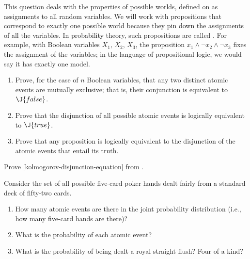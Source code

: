 \begin{exercise}%
This question deals with the properties of possible worlds, defined on  as assignments to all random variables.
We will work with propositions that correspond to exactly one possible world because they pin down the assignments of all the variables.
In probability theory, such propositions are called .
For example, with Boolean variables \(X_1\), \(X_2\), \(X_3\), the proposition \(x_1\land \lnot x_2 \land \lnot x_3\) fixes the assignment of the variables; in the language of propositional logic, we would say it has exactly one model.
\begin{enumerate}
\item Prove, for the case of \(n\) Boolean variables, that any two distinct atomic events are mutually exclusive; that is, their conjunction is equivalent to \(\J{false}\).
\item Prove that the disjunction of all possible atomic events is
logically equivalent to \(\J{true}\). 
\item Prove that any proposition is logically equivalent to the
disjunction of the atomic events that entail its truth.
\end{enumerate}
\end{exercise} 

\begin{exercise}%
Prove \eqref{kolmogorov-disjunction-equation} from .
\end{exercise} 

\begin{exercise}
Consider the set of all possible five-card poker hands dealt fairly
from a standard deck of fifty-two cards.
\begin{enumerate}
\item How many atomic events are there in the joint probability distribution
(i.e., how many five-card hands are there)?
\item What is the probability of each atomic event?
\item What is the probability of being dealt a royal straight
flush? Four of a kind?
\end{enumerate}
\end{exercise} 


